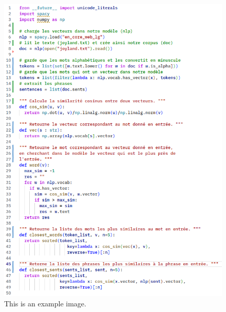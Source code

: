 \documentclass[11pt, a4paper]{report}
\begin{document}
\begin{figure}[h]
  \centering
  \includegraphics[width=1\textwidth]{code1.png}
  \caption{This is an example image.}
  \label{fig:example}
\end{figure}
\end{document}
